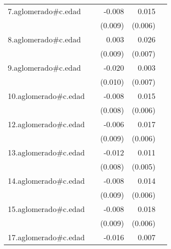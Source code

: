 {\begin{longtable}{l*{4}{D{.}{.}{-1}}}
\addlinespace
7.aglomerado#c.edad&                     &      -0.008         &       0.015\sym{*}  &                     \\
            &                     &     (0.009)         &     (0.006)         &                     \\
\addlinespace
8.aglomerado#c.edad&                     &       0.003         &       0.026\sym{***}&                     \\
            &                     &     (0.009)         &     (0.007)         &                     \\
\addlinespace
9.aglomerado#c.edad&                     &      -0.020\sym{*}  &       0.003         &                     \\
            &                     &     (0.010)         &     (0.007)         &                     \\
\addlinespace
10.aglomerado#c.edad&                     &      -0.008         &       0.015\sym{**} &                     \\
            &                     &     (0.008)         &     (0.006)         &                     \\
\addlinespace
12.aglomerado#c.edad&                     &      -0.006         &       0.017\sym{**} &                     \\
            &                     &     (0.009)         &     (0.006)         &                     \\
\addlinespace
13.aglomerado#c.edad&                     &      -0.012         &       0.011\sym{*}  &                     \\
            &                     &     (0.008)         &     (0.005)         &                     \\
\addlinespace
14.aglomerado#c.edad&                     &      -0.008         &       0.014\sym{*}  &                     \\
            &                     &     (0.009)         &     (0.006)         &                     \\
\addlinespace
15.aglomerado#c.edad&                     &      -0.008         &       0.018\sym{**} &                     \\
            &                     &     (0.009)         &     (0.006)         &                     \\
\addlinespace
17.aglomerado#c.edad&                     &      -0.016         &       0.007         &                     \\

\end{longtable}}
